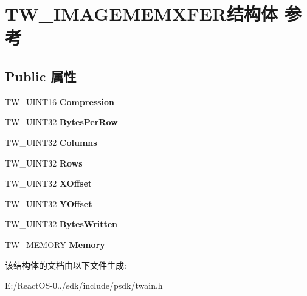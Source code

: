 \hypertarget{struct_t_w___i_m_a_g_e_m_e_m_x_f_e_r}{}\section{T\+W\+\_\+\+I\+M\+A\+G\+E\+M\+E\+M\+X\+F\+E\+R结构体 参考}
\label{struct_t_w___i_m_a_g_e_m_e_m_x_f_e_r}
\subsection*{Public 属性}
\begin{DoxyCompactItemize}
\item 
\mbox{\label{struct_t_w___i_m_a_g_e_m_e_m_x_f_e_r_a424ebe6c1cccbbdf4cbdb8f1d57c4c57}} 
T\+W\+\_\+\+U\+I\+N\+T16 {\bfseries Compression}
\item 
\mbox{\label{struct_t_w___i_m_a_g_e_m_e_m_x_f_e_r_ae7e283879293bfa67cf821661308b8bb}} 
T\+W\+\_\+\+U\+I\+N\+T32 {\bfseries Bytes\+Per\+Row}
\item 
\mbox{\label{struct_t_w___i_m_a_g_e_m_e_m_x_f_e_r_ad34535e9680df4e8743c7fc98d8f147c}} 
T\+W\+\_\+\+U\+I\+N\+T32 {\bfseries Columns}
\item 
\mbox{\label{struct_t_w___i_m_a_g_e_m_e_m_x_f_e_r_ae75014c6a4acbd34387f51a7e42c3129}} 
T\+W\+\_\+\+U\+I\+N\+T32 {\bfseries Rows}
\item 
\mbox{\label{struct_t_w___i_m_a_g_e_m_e_m_x_f_e_r_a2e7f0b534e29fb167570e9fb5667bedc}} 
T\+W\+\_\+\+U\+I\+N\+T32 {\bfseries X\+Offset}
\item 
\mbox{\label{struct_t_w___i_m_a_g_e_m_e_m_x_f_e_r_a71d9d7e784a6b0ecdcd3f79a0b57f447}} 
T\+W\+\_\+\+U\+I\+N\+T32 {\bfseries Y\+Offset}
\item 
\mbox{\label{struct_t_w___i_m_a_g_e_m_e_m_x_f_e_r_aa8fa7f0f7ad1064a6d017c0dec23e65c}} 
T\+W\+\_\+\+U\+I\+N\+T32 {\bfseries Bytes\+Written}
\item 
\mbox{\label{struct_t_w___i_m_a_g_e_m_e_m_x_f_e_r_a6515a399eb24ee88f1107474a175d347}} 
\hyperlink{struct_t_w___m_e_m_o_r_y}{T\+W\+\_\+\+M\+E\+M\+O\+RY} {\bfseries Memory}
\end{DoxyCompactItemize}


该结构体的文档由以下文件生成\+:\begin{DoxyCompactItemize}
\item 
E\+:/\+React\+O\+S-\/0../sdk/include/psdk/twain.\+h\end{DoxyCompactItemize}

